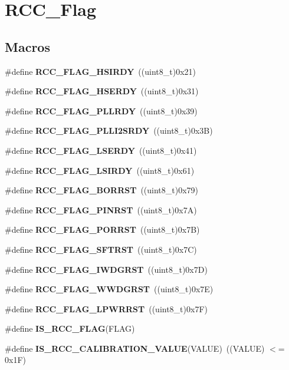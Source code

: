 \section{R\+C\+C\+\_\+\+Flag}
\label{group__RCC__Flag}
\subsection*{Macros}
\begin{DoxyCompactItemize}
\item 
\#define \textbf{ R\+C\+C\+\_\+\+F\+L\+A\+G\+\_\+\+H\+S\+I\+R\+DY}~((uint8\+\_\+t)0x21)
\item 
\#define \textbf{ R\+C\+C\+\_\+\+F\+L\+A\+G\+\_\+\+H\+S\+E\+R\+DY}~((uint8\+\_\+t)0x31)
\item 
\#define \textbf{ R\+C\+C\+\_\+\+F\+L\+A\+G\+\_\+\+P\+L\+L\+R\+DY}~((uint8\+\_\+t)0x39)
\item 
\#define \textbf{ R\+C\+C\+\_\+\+F\+L\+A\+G\+\_\+\+P\+L\+L\+I2\+S\+R\+DY}~((uint8\+\_\+t)0x3\+B)
\item 
\#define \textbf{ R\+C\+C\+\_\+\+F\+L\+A\+G\+\_\+\+L\+S\+E\+R\+DY}~((uint8\+\_\+t)0x41)
\item 
\#define \textbf{ R\+C\+C\+\_\+\+F\+L\+A\+G\+\_\+\+L\+S\+I\+R\+DY}~((uint8\+\_\+t)0x61)
\item 
\#define \textbf{ R\+C\+C\+\_\+\+F\+L\+A\+G\+\_\+\+B\+O\+R\+R\+ST}~((uint8\+\_\+t)0x79)
\item 
\#define \textbf{ R\+C\+C\+\_\+\+F\+L\+A\+G\+\_\+\+P\+I\+N\+R\+ST}~((uint8\+\_\+t)0x7\+A)
\item 
\#define \textbf{ R\+C\+C\+\_\+\+F\+L\+A\+G\+\_\+\+P\+O\+R\+R\+ST}~((uint8\+\_\+t)0x7\+B)
\item 
\#define \textbf{ R\+C\+C\+\_\+\+F\+L\+A\+G\+\_\+\+S\+F\+T\+R\+ST}~((uint8\+\_\+t)0x7\+C)
\item 
\#define \textbf{ R\+C\+C\+\_\+\+F\+L\+A\+G\+\_\+\+I\+W\+D\+G\+R\+ST}~((uint8\+\_\+t)0x7\+D)
\item 
\#define \textbf{ R\+C\+C\+\_\+\+F\+L\+A\+G\+\_\+\+W\+W\+D\+G\+R\+ST}~((uint8\+\_\+t)0x7\+E)
\item 
\#define \textbf{ R\+C\+C\+\_\+\+F\+L\+A\+G\+\_\+\+L\+P\+W\+R\+R\+ST}~((uint8\+\_\+t)0x7\+F)
\item 
\#define \textbf{ I\+S\+\_\+\+R\+C\+C\+\_\+\+F\+L\+AG}(F\+L\+AG)
\item 
\#define \textbf{ I\+S\+\_\+\+R\+C\+C\+\_\+\+C\+A\+L\+I\+B\+R\+A\+T\+I\+O\+N\+\_\+\+V\+A\+L\+UE}(V\+A\+L\+UE)~((V\+A\+L\+UE) $<$= 0x1\+F)
\end{DoxyCompactItemize}


